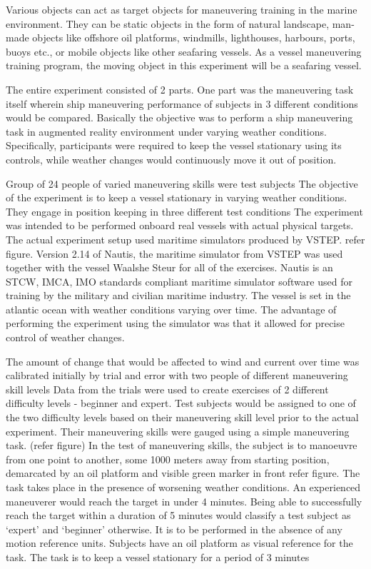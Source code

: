 Various objects can act as target objects for maneuvering training in the marine environment. They can be static objects in the form of natural landscape, man-made objects like offshore oil platforms, windmills, lighthouses, harbours, ports, buoys etc., or mobile objects like other seafaring vessels. As a vessel maneuvering training program, the moving object in this experiment will be a seafaring vessel. 


The entire experiment consisted of 2 parts. One part was the maneuvering task itself wherein ship maneuvering performance of subjects in 3 different conditions would be compared. Basically the objective was to perform a ship maneuvering task in augmented reality environment under varying weather conditions. Specifically, participants were required to keep the vessel stationary using its controls, while weather changes would continuously move it out of position.



Group of 24 people of varied maneuvering skills were test subjects
The objective of the experiment is to keep a vessel stationary in varying weather conditions.
They engage in position keeping in three different test conditions
The experiment was intended to be performed onboard real vessels with actual physical targets.
The actual experiment setup used maritime simulators produced by VSTEP. refer figure.
Version 2.14 of Nautis, the maritime simulator from VSTEP was used together with the vessel Waalshe Steur for all of the exercises.
Nautis is an STCW, IMCA, IMO standards compliant maritime simulator software used for training by the military and civilian maritime industry.
The vessel is set in the atlantic ocean with weather conditions varying over time.
The advantage of performing the experiment using the simulator was that it allowed for precise control of weather changes.


The amount of change that would be affected to wind and current over time was calibrated initially by trial and error with two people of different maneuvering skill levels
Data from the trials were used to create exercises of 2 different difficulty levels - beginner and expert. 
Test subjects would be assigned to one of the two difficulty levels based on their maneuvering skill level prior to the actual experiment.
Their maneuvering skills were gauged using a simple maneuvering task. (refer figure)
In the test of maneuvering skills, the subject is to manoeuvre from one point to another, some 1000 meters away from starting position, demarcated by an oil platform and visible green marker in front refer figure.
The task takes place in the presence of worsening weather conditions.
An experienced maneuverer would reach the target in under 4 minutes.
Being able to successfully reach the target within a duration of 5 minutes would classify a test subject as ‘expert’ and ‘beginner’ otherwise.
It is to be performed in the absence of any motion reference units.
Subjects have an oil platform as visual reference for the task.  
The task is to keep a vessel stationary for a period of 3 minutes

